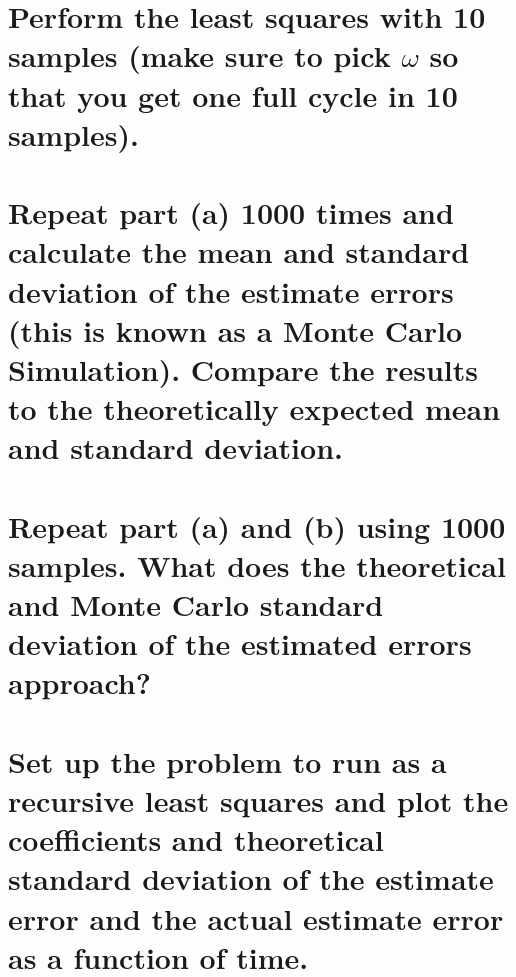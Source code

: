 \documentclass[12pt,letterpaper, onecolumn]{exam}
\begin{document}
\begin{questions}
\begin{parts}
        \part{Perform the least squares with 10 samples (make sure to pick $\omega$ so that you get one full cycle in 10 samples).}

        \solution{}

        \part{Repeat part (a) 1000 times and calculate the mean and standard deviation of the estimate errors (this is known as a Monte Carlo Simulation). Compare the results to the theoretically expected mean and standard deviation.}

        \solution{}

        \part{Repeat part (a) and (b) using 1000 samples. What does the theoretical and Monte Carlo standard deviation of the estimated errors approach?}

        \solution{}

        \part{Set up the problem to run as a recursive least squares and plot the coefficients and theoretical standard deviation of the estimate error and the actual estimate error as a function of time.}

        \solution{}
    \end{parts}
    \clearpage
    \begin{parts}

\end{parts}
\end{questions}
\end{document}
